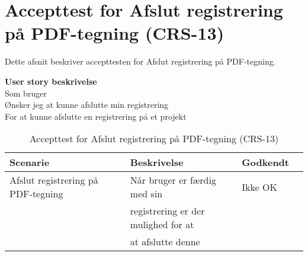 \section{Accepttest for Afslut registrering på PDF-tegning (CRS-13)}
Dette afsnit beskriver accepttesten for Afslut registrering på PDF-tegning.

\textbf{User story beskrivelse} \\
Som bruger \\
Ønsker jeg at kunne afslutte min registrering \\
For at kunne afslutte en registrering på et projekt

\begin{table}[H]
	\centering
	\begin{tabular}{|ll|l|ll|} \hline
		\textbf{Scenarie} &  & \textbf{Beskrivelse}&  \textbf{Godkendt}&  \\ \hline
		Afslut registrering på PDF-tegning&  &  Når bruger er færdig med sin &  Ikke OK&  \\
		& & registrering er der mulighed for at& & \\
		& & at afslutte denne& & \\ \hline
	\end{tabular}
	\caption{Accepttest for Afslut registrering på PDF-tegning (CRS-13)}
	\label{AcceptAfslutPDF}
\end{table}